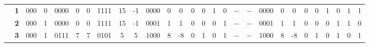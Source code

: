 \begin{figure}[H]
\begin{tcolorbox}[left=5mm,right=5mm,top=0mm,bottom=5mm,boxsep=0mm,
toptitle=0.5mm,bottomtitle=0.5mm,title=Resultados Teóricos \textit{versus} Resultados Experimentais,center title]
\begin{minipage}{\textwidth}
{\begin{tabular}{c|c|c|c|c|c|c|c|c|c|c|c|c|c|c|c|c|c|c|c|c|c|c|c|c|c|c|c|}
\cline{2-28}
                                                                                                           & \textbf{1}           & 000                  & 0                    & 0000                 & 0                                           & 0                                           & 1111                 & 15                                          & -1                                          & 0000                 & 0                                           & 0                                           & 0                    & 0                    & 1                    & 0                    & $-$                    & $-$                    & 0000                 & 0                                           & 0                                           & 0                    & 0                    & 1                    & 0                    & 1                    & 1                     \\ 
\cline{2-28}
                                                                                                           & \textbf{2}           & 000                  & 1                    & 0000                 & 0                                           & 0                                           & 1111                 & 15                                          & -1                                          & 0001                 & 1                                           & 1                                           & 0                    & 0                    & 0                    & 1                    & $-$                    & $-$                    & 0001                 & 1                                           & 1                                           & 0                    & 0                    & 0                    & 1                    & 1                    & 0                     \\ 
\cline{2-28}
                                                                                                           & \textbf{3}           & 000                  & 1                    & 0111                 & 7                                           & 7                                           & 0101                 & 5                                           & 5                                           & 1000                 & 8                                           & -8                                          & 0                    & 1                    & 0                    & 1                    & $-$                    & $-$                    & 1000                 & 8                                           & -8                                          & 0                    & 1                    & 0                    & 1                    & 0                    & 1                     \\ 

\end{tabular}}
\end{minipage}
\end{tcolorbox}
\end{figure}
